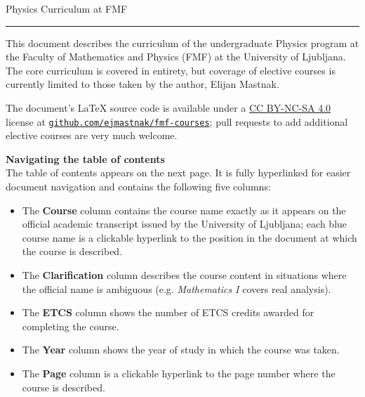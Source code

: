 \documentclass[11pt, a4paper]{article}
\begin{document}
\pagestyle{empty}  %

\begin{center}
\thispagestyle{empty}
\null
\vspace{20ex}
{\Huge Physics Curriculum at FMF}
\rule{0.75\textwidth}{0.5pt}
\vspace{2ex}

\begin{minipage}[t]{0.90\textwidth}
    This document describes the curriculum of the undergraduate Physics program at the Faculty of Mathematics and Physics (FMF) at the University of Ljubljana.
    The core curriculum is covered in entirety, but coverage of elective courses is currently limited to those taken by the author, Elijan Mastnak.
    
    \vspace{1ex}
    The document's \LaTeX{} source code is available under a \href{http://creativecommons.org/licenses/by-nc-sa/4.0/}{CC BY-NC-SA 4.0} license at \href{https://github.com/ejmastnak/fmf-courses}{\texttt{github.com/ejmastnak/fmf-courses}}; pull requests to add additional elective courses are very much welcome.

    \vspace{2ex}
    \textbf{\large Navigating the table of contents}\\[0.5ex]
    The table of contents appears on the next page. 
    It is fully hyperlinked for easier document navigation and contains the following five columns:
    \begin{itemize}
        \item The \textbf{Course} column contains the course name exactly as it appears on the official academic transcript issued by the University of Ljubljana;
        each blue course name is a clickable hyperlink to the position in the document at which the course is described.

        \item The \textbf{Clarification} column describes the course content in situations where the official name is ambiguous (e.g. \textit{Mathematics I} covers real analysis).

        \item The \textbf{ETCS} column shows the number of ETCS credits awarded for completing the course.

        \item The \textbf{Year} column shows the year of study in which the course was taken.

        \item The \textbf{Page} column is a clickable hyperlink to the page number where the course is described.


\end{itemize}
\end{minipage}
\end{center}
\end{document}
